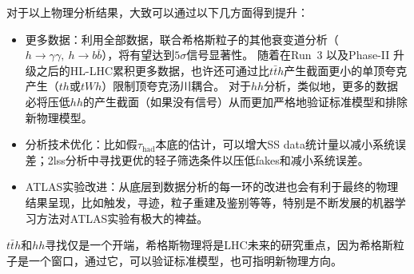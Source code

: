 对于以上物理分析结果，大致可以通过以下几方面得到提升：
\begin{itemize}
 \item 更多数据：利用全部\RunTwo 数据，联合希格斯粒子的其他衰变道分析（$h\rightarrow \gamma\gamma,~h\rightarrow b\bar{b}$），将有望达到$5\sigma$信号显著性。
随着在Run~3 以及Phase-II 升级之后的HL-LHC累积更多数据，也许还可通过比$t\bar{t}h$产生截面更小的单顶夸克产生（$th$或$tWh$）限制顶夸克汤川耦合。
对于$hh$分析，类似地，更多的数据必将压低$hh$的产生截面（如果没有信号）从而更加严格地验证标准模型和排除新物理模型。
 \item 分析技术优化：比如假$\tau_{\text{had}}$本底的估计，可以增大SS data统计量以减小系统误差；2lss分析中寻找更优的轻子筛选条件以压低fakes和减小系统误差。
 \item ATLAS实验改进：从底层到数据分析的每一环的改进也会有利于最终的物理结果呈现，比如触发，寻迹，粒子重建及鉴别等等，特别是不断发展的机器学习方法对ATLAS实验有极大的裨益。
\end{itemize}

$t\bar{t}h$和$hh$寻找仅是一个开端，希格斯物理将是LHC未来的研究重点，因为希格斯粒子是一个窗口，通过它，可以验证标准模型，也可指明新物理方向。